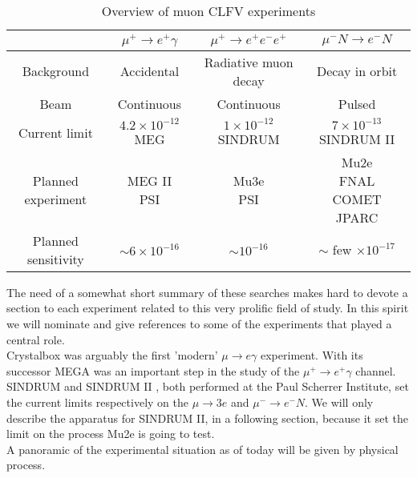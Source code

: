 \documentclass[12pt,a4paper,openright, oneside, titlepage]{book} %
\begin{document}
\begin{table}[!h]
\centering
\begin{tabular}{|c||c|c|c|}
\hline
& $\mu^+\rightarrow e^+\gamma$ & $\mu^+\rightarrow e^+e^-e^+$ & $\mu^- N \rightarrow e^- N$ \\
\hline \hline 
Background &
Accidental &
Radiative muon decay &
Decay in orbit \\
\hline
Beam &
Continuous &
Continuous &
Pulsed \\
\hline
Current limit &
\makecell{$4.2 \times 10^{-12}$ \\ MEG \cite{MEG}} &
\makecell{$1\times10^{-12}$ \\ SINDRUM \cite{SINDRUM}} & 
\makecell{$7\times10^{-13}$ \\ SINDRUM II \cite{SINDRUMII}} \\
\hline
Planned experiment &
\makecell{MEG II \\ PSI \cite{MEG_upgrade}\cite{MEG_II}\cite{Papa}}&
\makecell{Mu3e \\ PSI \cite{Mu3e:2014}\cite{Mu3e:2016}\cite{Papa}} &
\makecell{Mu2e \\ FNAL \cite{mu2e_proposal} \cite{MTDR}\\ COMET \\ JPARC\cite{COMET_2009}\cite{COMET_2012}\cite{COMET_2012_2}\cite{COMET_I}} \\
\hline
Planned sensitivity &
$\sim 6\times 10^{-16}$&
$\sim 10^{-16}$&
$\sim$ few $\times 10^{-17}$ \\
\hline
\end{tabular}
\caption{Overview of muon CLFV experiments}
\label{T_CLFV_mu}
\end{table}

\noindent The need of a somewhat short summary of these searches makes hard to devote a section to each experiment related to this very prolific field of study. In this spirit we will nominate and give references to some of the experiments that played a central role. \\
Crystalbox \cite{Crystalbox:1984} \cite{Crystalbox:1988} was arguably the first 'modern' $\mu\rightarrow e\gamma$ experiment. With its successor MEGA \cite{MEGA:1999} \cite{MEGA:2002} was an important step in the study of the $\mu^+\rightarrow e^+\gamma$ channel. SINDRUM \cite{SINDRUM} and SINDRUM II \cite{SINDRUMII}, both performed at the Paul Scherrer Institute, set the current limits respectively on the $\mu \rightarrow 3 e$ and $\mu^-\rightarrow e^- N$. We will only describe the apparatus for SINDRUM II, in a following section, because it set the limit on the process Mu2e is going to test.\\
A panoramic of the experimental situation as of today will be given by physical process.
\end{document}
